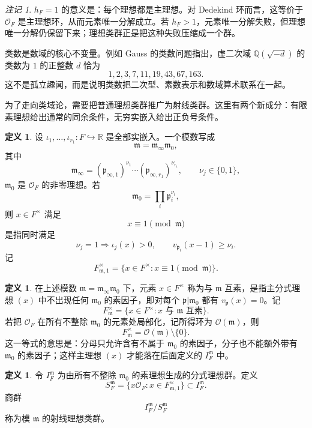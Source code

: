 \documentclass[11pt,a4paper,openany]{ctexbook}
\numberwithin{equation}{chapter}
\newcommand{\Q}{\mathbb{Q}}
\newcommand{\R}{\mathbb{R}}
\newcommand{\OF}{\mathcal{O}_F}
\theoremstyle{plain}
\theoremstyle{definition}
\newtheorem{definition}[theorem]{定义}
\theoremstyle{remark}
\newtheorem{remark}[theorem]{注记}
\begin{document}
\begin{remark}
$h_F=1$ 的意义是：每个理想都是主理想。对 Dedekind 环而言，这等价于 $\OF$ 是主理想环，从而元素唯一分解成立。若 $h_F>1$，元素唯一分解失败，但理想唯一分解仍保留下来；理想类群正是把这种失败压缩成一个群。
\end{remark}

类数是数域的核心不变量。例如 Gauss 的类数问题指出，虚二次域 $\Q(\sqrt{-d})$ 的类数为 $1$ 的正整数 $d$ 恰为
\[
1,2,3,7,11,19,43,67,163.
\]
这不是孤立趣闻，而是说明类数把二次型、素数表示和数域算术联系在一起。

为了走向类域论，需要把普通理想类群推广为射线类群。这里有两个新成分：有限素理想给出通常的同余条件，无穷实嵌入给出正负号条件。

\begin{definition}
设 $\iota_1,\dots,\iota_{r_1}:F\hookrightarrow\R$ 是全部实嵌入。一个模数写成
\[
\mathfrak m=\mathfrak m_\infty\mathfrak m_0,
\]
其中
\[
\mathfrak m_\infty=(\mathfrak p_{\infty,1})^{\nu_1}\cdots
(\mathfrak p_{\infty,r_1})^{\nu_{r_1}},\qquad \nu_j\in\{0,1\},
\]
$\mathfrak m_0$ 是 $\OF$ 的非零理想。若
\[
\mathfrak m_0=\prod_i\mathfrak p_i^{\nu_i},
\]
则 $x\in F^\times$ 满足
\[
x\equiv1\pmod{\mathfrak m}
\]
是指同时满足
\[
\nu_j=1\Rightarrow \iota_j(x)>0,\qquad
v_{\mathfrak p_i}(x-1)\ge\nu_i.
\]
记
\[
F_{\mathfrak m,1}^{\times}
=\{x\in F^\times:x\equiv1\pmod{\mathfrak m}\}.
\]
\end{definition}

\begin{definition}
在上述模数 $\mathfrak m=\mathfrak m_\infty\mathfrak m_0$ 下，元素
$x\in F^\times$ 称为与 $\mathfrak m$ 互素，是指主分式理想 $(x)$ 中不出现任何
$\mathfrak m_0$ 的素因子，即对每个 $\mathfrak p|\mathfrak m_0$ 都有
$v_{\mathfrak p}(x)=0$。记
\[
F_{\mathfrak m}^{\times}
=\{x\in F^\times:x\text{ 与 }\mathfrak m\text{ 互素}\}.
\]
若把 $\OF$ 在所有不整除 $\mathfrak m_0$ 的元素处局部化，记所得环为
$\mathcal O(\mathfrak m)$，则
\[
F_{\mathfrak m}^{\times}=\mathcal O(\mathfrak m)\setminus\{0\}.
\]
这一等式的意思是：分母只允许含有不属于 $\mathfrak m_0$ 的素因子，分子也不能额外带有
$\mathfrak m_0$ 的素因子；这样主理想 $(x)$ 才能落在后面定义的
$I_F^{\mathfrak m}$ 中。
\end{definition}

\begin{definition}
令 $I_F^{\mathfrak m}$ 为由所有不整除 $\mathfrak m_0$ 的素理想生成的分式理想群。定义
\[
S_F^{\mathfrak m}
=\{x\OF:x\in F_{\mathfrak m,1}^{\times}\}\subset I_F^{\mathfrak m}.
\]
商群
\[
I_F^{\mathfrak m}/S_F^{\mathfrak m}
\]
称为模 $\mathfrak m$ 的射线理想类群。
\end{definition}
\end{document}
